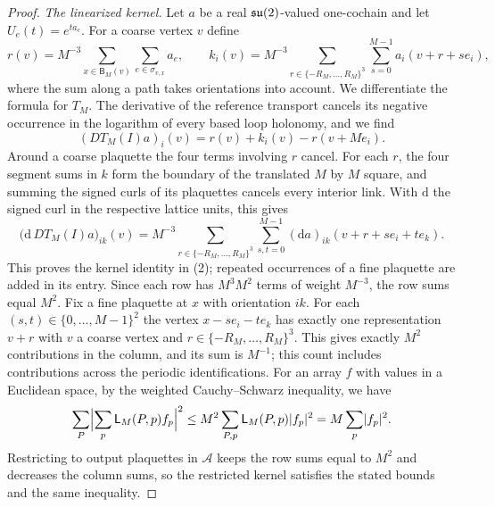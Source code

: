\begin{proof}
\emph{The linearized kernel.} Let $a$ be a real $\mathfrak{su}(2)$-valued one-cochain and let $U_e(t)=e^{ta_e}$. For a coarse vertex $v$ define
\[
 r(v)=M^{-3}\sum_{x\in\mathsf B_M(v)}\sum_{e\in\sigma_{v,x}}a_e,\qquad k_i(v)=M^{-3}\sum_{r\in\{-R_M,\dots,R_M\}^3}\sum_{s=0}^{M-1}a_i(v+r+se_i),
\]
where the sum along a path takes orientations into account. We differentiate the formula for $T_M$. The derivative of the reference transport cancels its negative occurrence in the logarithm of every based loop holonomy, and we find
\[
 (DT_M(I)a)_i(v)=r(v)+k_i(v)-r(v+Me_i).
\]
Around a coarse plaquette the four terms involving $r$ cancel. For each $r$, the four segment sums in $k$ form the boundary of the translated $M$ by $M$ square, and summing the signed curls of its plaquettes cancels every interior link. With $\mathrm d$ the signed curl in the respective lattice units, this gives
\begin{equation}\label{ch04:eq:flat-stokes}
 \bigl(\mathrm d\,DT_M(I)a\bigr)_{ik}(v)=M^{-3}\sum_{r\in\{-R_M,\dots,R_M\}^3}\sum_{s,t=0}^{M-1}(\mathrm da)_{ik}(v+r+se_i+te_k).
\end{equation}
This proves the kernel identity in (2); repeated occurrences of a fine plaquette are added in its entry. Since each row has $M^3M^2$ terms of weight $M^{-3}$, the row sums equal $M^2$. Fix a fine plaquette at $x$ with orientation $ik$. For each $(s,t)\in\{0,\dots,M-1\}^2$ the vertex $x-se_i-te_k$ has exactly one representation $v+r$ with $v$ a coarse vertex and $r\in\{-R_M,\dots,R_M\}^3$. This gives exactly $M^2$ contributions in the column, and its sum is $M^{-1}$; this count includes contributions across the periodic identifications. For an array $f$ with values in a Euclidean space, by the weighted Cauchy--Schwarz inequality, we have
\begin{equation}\label{ch04:eq:kernel-schur}
 \sum_P\Bigl\lvert\sum_p\mathsf L_M(P,p)f_p\Bigr\rvert^2\le M^2\sum_{P,p}\mathsf L_M(P,p)\lvert f_p\rvert^2=M\sum_p\lvert f_p\rvert^2.
\end{equation}
Restricting to output plaquettes in $\mathcal A$ keeps the row sums equal to $M^2$ and decreases the column sums, so the restricted kernel satisfies the stated bounds and the same inequality.


\end{proof}
